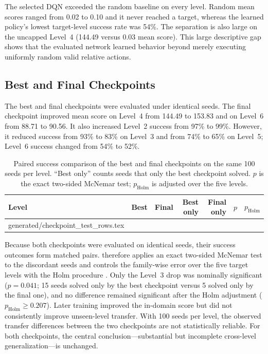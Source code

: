 \documentclass[journal]{IEEEtran}
\makeatletter
\newcommand{\tablerows}[1]{\@@input #1 }
\makeatother
\begin{document}
The selected DQN exceeded the random baseline on every level. Random mean scores
ranged from 0.02 to 0.10 and it never reached a target, whereas the learned
policy's lowest target-level success rate was 54\%. The separation is also large
on the uncapped Level~4 (144.49 versus 0.03 mean score). This large descriptive
gap shows that the evaluated network learned behavior beyond merely executing
uniformly random valid relative actions.

\subsection{Best and Final Checkpoints}

The best and final checkpoints were evaluated under identical seeds. The final
checkpoint improved mean score on Level~4 from 144.49 to 153.83 and on Level~6
from 88.71 to 90.56. It also increased Level~2 success from 97\% to 99\%.
However, it reduced success from 93\% to 83\% on Level~3 and from 74\% to 65\%
on Level~5; Level~6 success changed from 54\% to 52\%.

\begin{table}[t]
  \centering
  \caption{Paired success comparison of the best and final checkpoints on the
  same 100 seeds per level. ``Best only'' counts seeds that only the best
  checkpoint solved. $p$ is the exact two-sided McNemar test; $p_\mathrm{Holm}$
  is adjusted over the five levels.}
  \label{tab:checkpoint-test}
  \begin{tabular}{lrrrrrr}
    \toprule
    Level & Best & Final & Best only & Final only & $p$ & $p_\mathrm{Holm}$ \\
    \midrule
\tablerows{generated/checkpoint_test_rows.tex}
    \bottomrule
  \end{tabular}
\end{table}

Because both checkpoints were evaluated on identical seeds, their success
outcomes form matched pairs.  therefore applies an
exact two-sided McNemar test to the discordant seeds \cite{mcnemar1947note} and
controls the family-wise error over the five target levels with the Holm
procedure \cite{holm1979simple}. Only the Level~3 drop was nominally
significant ($p=0.041$; 15 seeds solved only by the best checkpoint versus 5
solved only by the final one), and no difference remained significant after
the Holm adjustment ($p_\mathrm{Holm}\ge0.207$). Later training improved the
in-domain score but did not consistently improve unseen-level transfer. With
100 seeds per level, the observed transfer differences between the two
checkpoints are not statistically reliable. For both checkpoints, the central
conclusion---substantial but incomplete cross-level generalization---is
unchanged.
\end{document}
